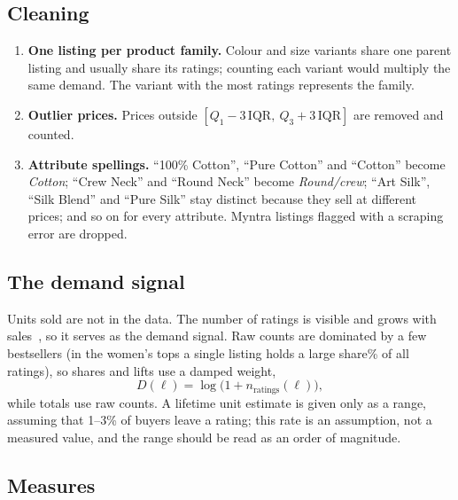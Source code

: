 \subsection{Cleaning}

\begin{enumerate}
\item \textbf{One listing per product family.} Colour and size variants share one parent listing and usually share its ratings; counting each variant would multiply the same demand. The variant with the most ratings represents the family.
\item \textbf{Outlier prices.} Prices outside $[Q_1 - 3\,\mathrm{IQR},\ Q_3 + 3\,\mathrm{IQR}]$ are removed and counted.
\item \textbf{Attribute spellings.} ``100\% Cotton'', ``Pure Cotton'' and ``Cotton'' become \emph{Cotton}; ``Crew Neck'' and ``Round Neck'' become \emph{Round/crew}; ``Art Silk'', ``Silk Blend'' and ``Pure Silk'' stay distinct because they sell at different prices; and so on for every attribute. Myntra listings flagged with a scraping error are dropped.
\end{enumerate}

\subsection{The demand signal}

Units sold are not in the data. The number of ratings is visible and grows with sales~\cite{wom}, so it serves as the demand signal. Raw counts are dominated by a few bestsellers (in the women's tops a single listing holds \ifMarket\vMkTopTopOne\else a large share\fi{}\% of all ratings), so shares and lifts use a damped weight,
\begin{equation}
D(\ell) = \log\big(1 + n_\text{ratings}(\ell)\big),
\end{equation}
while totals use raw counts. A lifetime unit estimate is given only as a range, assuming that 1--3\% of buyers leave a rating; this rate is an assumption, not a measured value, and the range should be read as an order of magnitude.

\subsection{Measures}

